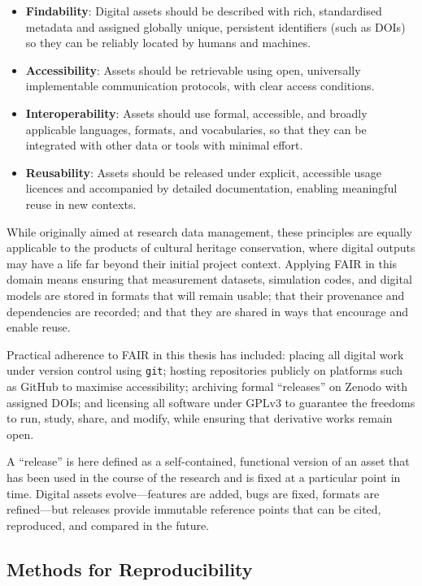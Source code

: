 \begin{itemize}
    \item \textbf{Findability}: Digital assets should be described with rich, standardised metadata and assigned globally unique, persistent identifiers (such as DOIs) so they can be reliably located by humans and machines.
    \item \textbf{Accessibility}: Assets should be retrievable using open, universally implementable communication protocols, with clear access conditions.
    \item \textbf{Interoperability}: Assets should use formal, accessible, and broadly applicable languages, formats, and vocabularies, so that they can be integrated with other data or tools with minimal effort.
    \item \textbf{Reusability}: Assets should be released under explicit, accessible usage licences and accompanied by detailed documentation, enabling meaningful reuse in new contexts.
\end{itemize}

While originally aimed at research data management, these principles are equally applicable to the products of cultural heritage conservation, where digital outputs may have a life far beyond their initial project context. Applying FAIR in this domain means ensuring that measurement datasets, simulation codes, and digital models are stored in formats that will remain usable; that their provenance and dependencies are recorded; and that they are shared in ways that encourage and enable reuse.

Practical adherence to FAIR in this thesis has included: placing all digital work under version control using \texttt{git}; hosting repositories publicly on platforms such as GitHub to maximise accessibility; archiving formal “releases” on Zenodo with assigned DOIs; and licensing all software under GPLv3 to guarantee the freedoms to run, study, share, and modify, while ensuring that derivative works remain open.

A “release” is here defined as a self-contained, functional version of an asset that has been used in the course of the research and is fixed at a particular point in time. Digital assets evolve—features are added, bugs are fixed, formats are refined—but releases provide immutable reference points that can be cited, reproduced, and compared in the future.

\subsection{Methods for Reproducibility}

